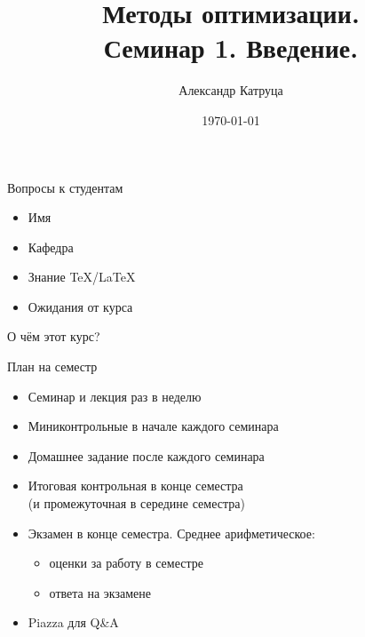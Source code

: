 \documentclass[12pt]{beamer}
\title[Семинар 1]{Методы оптимизации. \\
Семинар 1. Введение.}
\author{Александр Катруца}
\institute{Московский физико-технический институт,\\
Факультет Управления и Прикладной Математики}
\date{\today}
\begin{document}
\begin{frame}
\titlepage
\end{frame}

\begin{frame}{Вопросы к студентам}
\begin{itemize}
\item Имя
\item Кафедра
\item Знание \TeX/\LaTeX
\item Ожидания от курса
\end{itemize}

\end{frame}

\begin{frame}{О чём этот курс?}
\end{frame}

\begin{frame}{План на семестр}
\begin{itemize}[<+->]
\item Семинар и лекция раз в неделю
\item Миниконтрольные в начале каждого семинара
\item Домашнее задание после каждого семинара
\item Итоговая контрольная в конце семестра \\ (и промежуточная в середине семестра)
\item Экзамен в конце семестра. Среднее арифметическое:
\begin{itemize}
\item оценки за работу в семестре
\item ответа на экзамене
\end{itemize}
\item Piazza для Q\&A
\end{itemize}
\end{frame}
\end{document}
